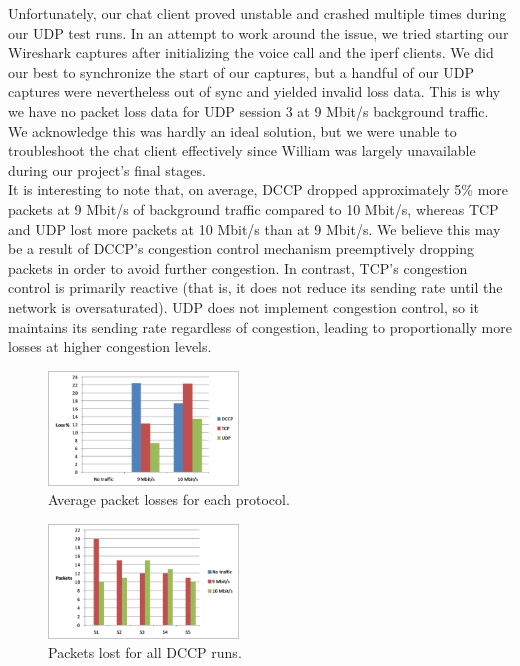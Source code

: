 \documentclass[9pt,twocolumn]{article}
\begin{document}
Unfortunately, our chat client proved unstable and crashed multiple times during
our UDP test runs. In an attempt to work around the issue, we tried starting our
Wireshark captures after initializing the voice call and the iperf clients. We
did our best to synchronize the start of our captures, but a handful of our UDP
captures were nevertheless out of sync and yielded invalid loss data. This is
why we have no packet loss data for UDP session 3 at 9 Mbit/s background
traffic. We acknowledge this was hardly an ideal solution, but we were unable to
troubleshoot the chat client effectively since William was largely unavailable
during our project's final stages.\\

It is interesting to note that, on average, DCCP dropped approximately 5\% more
packets at 9 Mbit/s of background traffic compared to 10 Mbit/s, whereas TCP and
UDP lost more packets at 10 Mbit/s than at 9 Mbit/s. We believe this may be a
result of DCCP's congestion control mechanism preemptively dropping packets in
order to avoid further congestion.  In contrast, TCP's congestion control is
primarily reactive (that is, it does not reduce its sending rate until the
network is oversaturated). UDP does not implement congestion control, so it
maintains its sending rate regardless of congestion, leading to proportionally
more losses at higher congestion levels.\\

\begin{figure}[h]
   \centering
      \includegraphics[width=0.45\textwidth]{pics/avg_losses}
   \caption{Average packet losses for each protocol.}
\label{fig:avg_losses}
\end{figure}

\begin{figure}[h]
   \centering
      \includegraphics[width=0.45\textwidth]{pics/dccp_losses}
   \caption{Packets lost for all DCCP runs.}
\label{fig:dccp_losses}
\end{figure}
\end{document}
